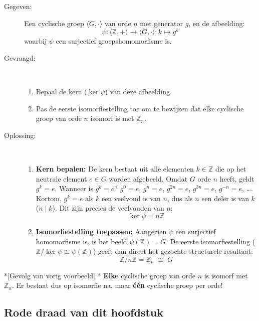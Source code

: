 \newpage
\textbf{} 
\begin{description}
    \item[Gegeven:] Een cyclische groep $\langle G, \cdot \rangle$ van orde $n$ met generator $g$, en de afbeelding:
    $$ \psi: \langle\mathbb{Z}, +\rangle \to \langle G, \cdot\rangle : k \mapsto g^k $$
    waarbij $\psi$ een surjectief groepshomomorfisme is.
    
    \item[Gevraagd:] \
    \begin{enumerate}
        \item Bepaal de kern ($\ker\psi$) van deze afbeelding.
        \item Pas de eerste isomorfiestelling toe om te bewijzen dat elke cyclische groep van orde $n$ isomorf is met $\mathbb{Z}_n$.
    \end{enumerate}
    
    \item[Oplossing:] \
    \begin{enumerate}
        \item \textbf{Kern bepalen:} De kern bestaat uit alle elementen $k \in \mathbb{Z}$ die op het neutrale element $e \in G$ worden afgebeeld. Omdat $G$ orde $n$ heeft, geldt $g^k = e$. Wanneer is $g^k=e$? $g^{0}=e$, $g^n=e$, $g^{2n}=e$, $g^{3n}=e$, $g^{-n}=e$, \dots. Kortom, $g^k=e$ als $k$ een veelvoud is van $n$, dus als $n$ een deler is van $k$ ($n \mid k$). Dit zijn precies de veelvouden van $n$:
        $$ \ker\psi = n\mathbb{Z} $$
        
        \item \textbf{Isomorfiestelling toepassen:} Aangezien $\psi$ een surjectief homomorfisme is, is het beeld $\psi(\mathbb{Z}) = G$. De eerste isomorfiestelling ($\mathbb{Z}/\ker\psi \cong \psi(\mathbb{Z})$) geeft dan direct het gezochte structurele resultaat:
        $$ \mathbb{Z}/n\mathbb{Z} = \mathbb{Z}_n \;\cong\; G $$
    \end{enumerate}
\end{description}

\begin{nicecorollary}*[Gevolg van vorig voorbeeld]
    \nextpart[]*
    \textbf{Elke} cyclische groep van orde $n$ is isomorf met $\mathbb{Z}_n$. Er bestaat dus op isomorfie na, maar \textbf{één} cyclische groep per orde!
\end{nicecorollary}

\subsection{Rode draad van dit hoofdstuk}

